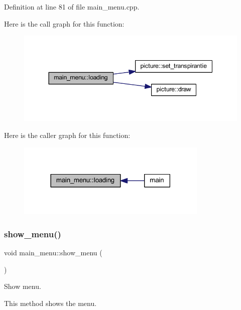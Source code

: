 Definition at line 81 of file main\+\_\+menu.\+cpp.

Here is the call graph for this function\+:
\nopagebreak
\begin{figure}[H]
\begin{center}
\leavevmode
\includegraphics[width=344pt]{classmain__menu_a83e10a5ce65747f1de76e40d32dd8e5b_cgraph}
\end{center}
\end{figure}
Here is the caller graph for this function\+:
\nopagebreak
\begin{figure}[H]
\begin{center}
\leavevmode
\includegraphics[width=258pt]{classmain__menu_a83e10a5ce65747f1de76e40d32dd8e5b_icgraph}
\end{center}
\end{figure}
\mbox{\label{classmain__menu_ac653f7645e7dab1807f141ba2395dc5c}} 
\subsubsection{\texorpdfstring{show\+\_\+menu()}{show\_menu()}}
{\footnotesize\ttfamily void main\+\_\+menu\+::show\+\_\+menu (\begin{DoxyParamCaption}{ }\end{DoxyParamCaption})}



Show menu. 

This method shows the menu.~\newline
